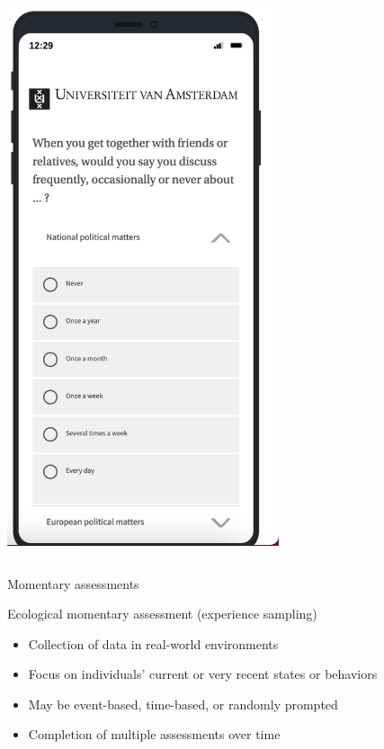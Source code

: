 \documentclass[aspectratio=169]{beamer}
\begin{document}
\begin{frame}
\begin{column}{0.45\textwidth}
\begin{center}
\includegraphics[width=0.6\textwidth]{figures/mobile-list.png}
\end{center}
\end{column}


\end{frame}
\begin{frame}{Momentary assessments}

Ecological momentary assessment (experience sampling)

\begin{itemize}
    \item Collection of data in real-world environments
    \item Focus on individuals’ current or very recent states or behaviors
    \item May be event-based, time-based, or randomly prompted
    \item Completion of multiple assessments over time
\end{itemize}

\end{frame}
\end{document}
